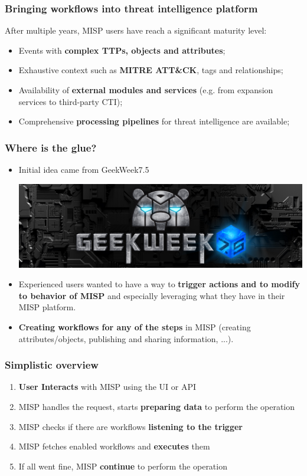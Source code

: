 
\begin{frame}[t,plain]
\titlepage
\end{frame}

\begin{frame}
    \frametitle{Bringing workflows into threat intelligence platform}
    After multiple years, MISP users have reach a significant maturity level:
    \begin{itemize}
        \item Events with {\bf complex TTPs, objects and attributes};
        \item Exhaustive context such as {\bf MITRE ATT\&CK}, tags and relationships;
        \item Availability of {\bf external modules and services} (e.g. from expansion services to third-party CTI);
        \item Comprehensive {\bf processing pipelines} for threat intelligence are available;
    \end{itemize}
\end{frame}

\begin{frame}
    \frametitle{Where is the glue?}
    \begin{itemize}
        \item Initial idea came from GeekWeek7.5
        \begin{center}
            \includegraphics[width=0.5\linewidth]{pictures/geekweek75.jpg}
        \end{center}
    \item Experienced users wanted to have a way to {\bf trigger actions and to modify to behavior of MISP} and especially leveraging what they have in their MISP platform.
    \item {\bf Creating workflows for any of the steps} in MISP (creating attributes/objects, publishing and sharing information, ...). 
    \end{itemize}
\end{frame}

\begin{frame}
    \frametitle{Simplistic overview}
    \begin{enumerate}
        \item \textbf{User Interacts} with MISP using the UI or API
        \item MISP handles the request, starts \textbf{preparing data} to perform the operation
        \item MISP checks if there are workflows \textbf{listening to the trigger}
        \item MISP fetches enabled workflows and \textbf{executes} them
        \item If all went fine, MISP \textbf{continue} to perform the operation
    \end{enumerate}
\end{frame}


